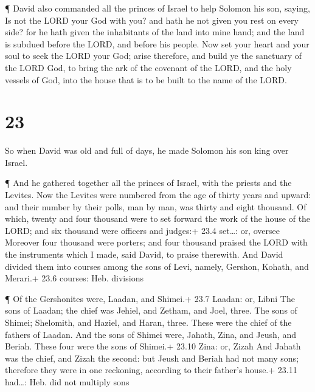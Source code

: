  ¶ David also commanded all the princes of Israel to help
Solomon his son, saying,  Is not the LORD your God with
you? and hath he not given you rest on every side? for he hath given the
inhabitants of the land into mine hand; and the land is subdued before
the LORD, and before his people.  Now set your heart and
your soul to seek the LORD your God; arise therefore, and build ye the
sanctuary of the LORD God, to bring the ark of the covenant of the LORD,
and the holy vessels of God, into the house that is to be built to the
name of the LORD.

\hypertarget{section-22}{%
\section{23}\label{section-22}}

 So when David was old and full of days, he made Solomon his
son king over Israel.

 ¶ And he gathered together all the princes of Israel, with
the priests and the Levites.  Now the Levites were numbered
from the age of thirty years and upward: and their number by their
polls, man by man, was thirty and eight thousand.  Of which,
twenty and four thousand were to set forward the work of the house of
the LORD; and six thousand were officers and judges:+ 23.4 set\ldots:
or, oversee  Moreover four thousand were porters; and four
thousand praised the LORD with the instruments which I made, said David,
to praise therewith.  And David divided them into courses
among the sons of Levi, namely, Gershon, Kohath, and Merari.+ 23.6
courses: Heb. divisions

 ¶ Of the Gershonites were, Laadan, and Shimei.+ 23.7
Laadan: or, Libni  The sons of Laadan; the chief was Jehiel,
and Zetham, and Joel, three.  The sons of Shimei; Shelomith,
and Haziel, and Haran, three. These were the chief of the fathers of
Laadan.  And the sons of Shimei were, Jahath, Zina, and
Jeush, and Beriah. These four were the sons of Shimei.+ 23.10 Zina: or,
Zizah  And Jahath was the chief, and Zizah the second: but
Jeush and Beriah had not many sons; therefore they were in one
reckoning, according to their father's house.+ 23.11 had\ldots: Heb. did
not multiply sons

